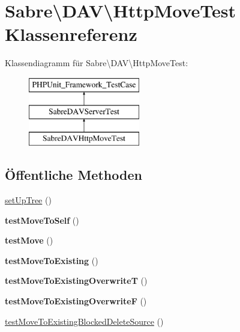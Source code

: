 \hypertarget{class_sabre_1_1_d_a_v_1_1_http_move_test}{}\section{Sabre\textbackslash{}D\+AV\textbackslash{}Http\+Move\+Test Klassenreferenz}
\label{class_sabre_1_1_d_a_v_1_1_http_move_test}
Klassendiagramm für Sabre\textbackslash{}D\+AV\textbackslash{}Http\+Move\+Test\+:\begin{figure}[H]
\begin{center}
\leavevmode
\includegraphics[height=3.000000cm]{class_sabre_1_1_d_a_v_1_1_http_move_test}
\end{center}
\end{figure}
\subsection*{Öffentliche Methoden}
\begin{DoxyCompactItemize}
\item 
\mbox{\hyperlink{class_sabre_1_1_d_a_v_1_1_http_move_test_aed2e57d9021d9d3e7d5cb3e5beb2c765}{set\+Up\+Tree}} ()
\item 
\mbox{\label{class_sabre_1_1_d_a_v_1_1_http_move_test_a92d0f6cff30a4e88dac63de09a5e38b1}} 
{\bfseries test\+Move\+To\+Self} ()
\item 
\mbox{\label{class_sabre_1_1_d_a_v_1_1_http_move_test_a34da67c6217f7eff87cea2e7823cf21e}} 
{\bfseries test\+Move} ()
\item 
\mbox{\label{class_sabre_1_1_d_a_v_1_1_http_move_test_a352e6385008fe501cdee621db3cf124a}} 
{\bfseries test\+Move\+To\+Existing} ()
\item 
\mbox{\label{class_sabre_1_1_d_a_v_1_1_http_move_test_a78a1d7d3529e80995c1713188c6d3ae8}} 
{\bfseries test\+Move\+To\+Existing\+OverwriteT} ()
\item 
\mbox{\label{class_sabre_1_1_d_a_v_1_1_http_move_test_a77ed342088d6eb77536b7dbff1ff0c60}} 
{\bfseries test\+Move\+To\+Existing\+OverwriteF} ()
\item 
\mbox{\hyperlink{class_sabre_1_1_d_a_v_1_1_http_move_test_afa9b76412c488808286670197c7e2e22}{test\+Move\+To\+Existing\+Blocked\+Delete\+Source}} ()
\end{DoxyCompactItemize}
